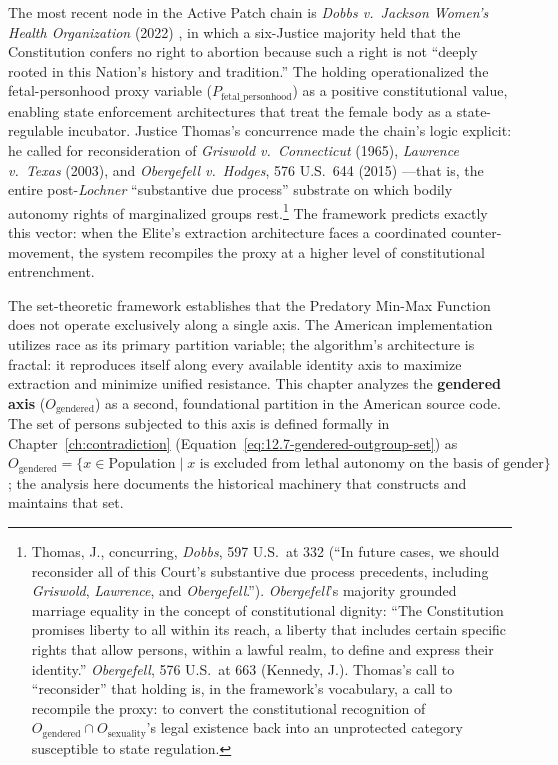 The most recent node in the Active Patch chain is \textit{Dobbs v.\ Jackson Women's Health Organization} (2022) \cite{dobbs}, in which a six-Justice majority held that the Constitution confers no right to abortion because such a right is not ``deeply rooted in this Nation's history and tradition.'' The holding operationalized the fetal-personhood proxy variable ($P_{\text{fetal\_personhood}}$) as a positive constitutional value, enabling state enforcement architectures that treat the female body as a state-regulable incubator. Justice Thomas's concurrence made the chain's logic explicit: he called for reconsideration of \textit{Griswold v.\ Connecticut} (1965), \textit{Lawrence v.\ Texas} (2003), and \textit{Obergefell v.\ Hodges}, 576 U.S.\ 644 (2015) \cite{obergefell}---that is, the entire post-\textit{Lochner} ``substantive due process'' substrate on which bodily autonomy rights of marginalized groups rest.\footnote{Thomas, J., concurring, \textit{Dobbs}, 597 U.S.\ at 332 (``In future cases, we should reconsider all of this Court's substantive due process precedents, including \textit{Griswold}, \textit{Lawrence}, and \textit{Obergefell}.'').  \textit{Obergefell}'s majority grounded marriage equality in the concept of constitutional dignity: ``The Constitution promises liberty to all within its reach, a liberty that includes certain specific rights that allow persons, within a lawful realm, to define and express their identity.'' \textit{Obergefell}, 576 U.S.\ at 663 (Kennedy, J.). Thomas's call to ``reconsider'' that holding is, in the framework's vocabulary, a call to recompile the proxy: to convert the constitutional recognition of $O_{\text{gendered}} \cap O_{\text{sexuality}}$'s legal existence back into an unprotected category susceptible to state regulation.} The framework predicts exactly this vector: when the Elite's extraction architecture faces a coordinated counter-movement, the system recompiles the proxy at a higher level of constitutional entrenchment.

The set-theoretic framework establishes that the Predatory Min-Max Function does not operate exclusively along a single axis. The American implementation utilizes race as its primary partition variable; the algorithm's architecture is fractal: it reproduces itself along every available identity axis to maximize extraction and minimize unified resistance. This chapter analyzes the \textbf{gendered axis} ($O_{\text{gendered}}$) as a second, foundational partition in the American source code. The set of persons subjected to this axis is defined formally in Chapter~\ref{ch:contradiction} (Equation~\ref{eq:12.7-gendered-outgroup-set}) as $O_{\text{gendered}} = \{x \in \text{Population} \mid x \text{ is excluded from lethal autonomy on the basis of gender}\}$; the analysis here documents the historical machinery that constructs and maintains that set.

